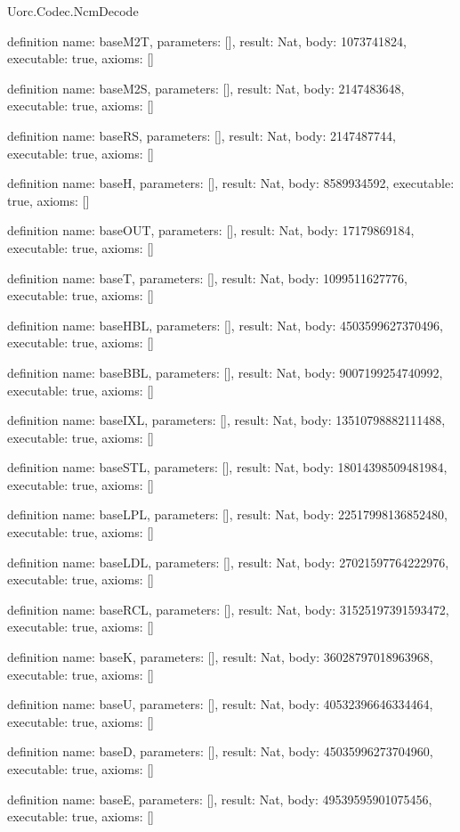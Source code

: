 \begin{lexlean}{Uorc.Codec.NcmDecode}
\begin{semanticmodule}
definition{
  name: baseM2T,
  parameters: [],
  result: Nat,
  body: 1073741824,
  executable: true,
  axioms: []
}

definition{
  name: baseM2S,
  parameters: [],
  result: Nat,
  body: 2147483648,
  executable: true,
  axioms: []
}

definition{
  name: baseRS,
  parameters: [],
  result: Nat,
  body: 2147487744,
  executable: true,
  axioms: []
}

definition{
  name: baseH,
  parameters: [],
  result: Nat,
  body: 8589934592,
  executable: true,
  axioms: []
}

definition{
  name: baseOUT,
  parameters: [],
  result: Nat,
  body: 17179869184,
  executable: true,
  axioms: []
}

definition{
  name: baseT,
  parameters: [],
  result: Nat,
  body: 1099511627776,
  executable: true,
  axioms: []
}

definition{
  name: baseHBL,
  parameters: [],
  result: Nat,
  body: 4503599627370496,
  executable: true,
  axioms: []
}

definition{
  name: baseBBL,
  parameters: [],
  result: Nat,
  body: 9007199254740992,
  executable: true,
  axioms: []
}

definition{
  name: baseIXL,
  parameters: [],
  result: Nat,
  body: 13510798882111488,
  executable: true,
  axioms: []
}

definition{
  name: baseSTL,
  parameters: [],
  result: Nat,
  body: 18014398509481984,
  executable: true,
  axioms: []
}

definition{
  name: baseLPL,
  parameters: [],
  result: Nat,
  body: 22517998136852480,
  executable: true,
  axioms: []
}

definition{
  name: baseLDL,
  parameters: [],
  result: Nat,
  body: 27021597764222976,
  executable: true,
  axioms: []
}

definition{
  name: baseRCL,
  parameters: [],
  result: Nat,
  body: 31525197391593472,
  executable: true,
  axioms: []
}

definition{
  name: baseK,
  parameters: [],
  result: Nat,
  body: 36028797018963968,
  executable: true,
  axioms: []
}

definition{
  name: baseU,
  parameters: [],
  result: Nat,
  body: 40532396646334464,
  executable: true,
  axioms: []
}

definition{
  name: baseD,
  parameters: [],
  result: Nat,
  body: 45035996273704960,
  executable: true,
  axioms: []
}

definition{
  name: baseE,
  parameters: [],
  result: Nat,
  body: 49539595901075456,
  executable: true,
  axioms: []
}


\end{semanticmodule}
\end{lexlean}

